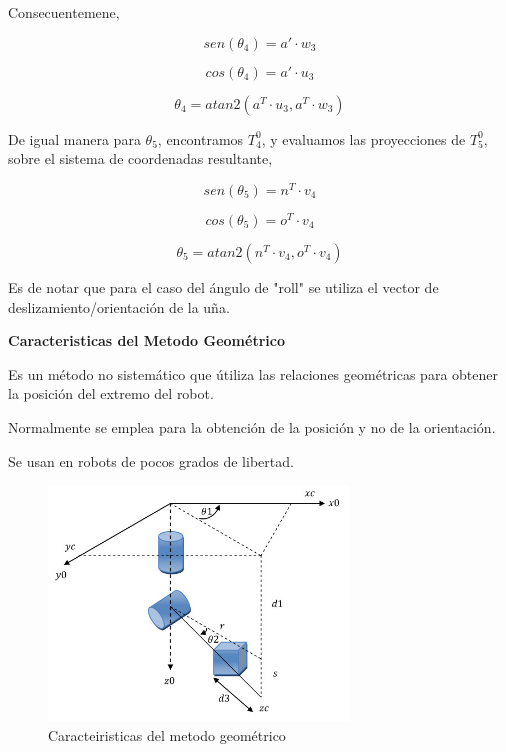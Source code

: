 \documentclass[letter,openright,12pt,spanish]{report}
\begin{document}
Consecuentemene,

\begin{displaymath}
sen(\theta_4)=a'\cdot w_3
\end{displaymath}

\begin{displaymath}
cos(\theta_4)=a'\cdot u_3
\end{displaymath}

\begin{displaymath}
\theta_4=atan2(a^T\cdot u_3,a^T\cdot w_3)
\end{displaymath}

De igual manera para $\theta_5$, encontramos $T^0_4$, y evaluamos las proyecciones de $T^0_5$, sobre el sistema de coordenadas resultante,

\begin{displaymath}
sen(\theta_5)=n^T\cdot v_4
\end{displaymath}

\begin{displaymath}
cos(\theta_5)=o^T \cdot v_4
\end{displaymath}

\begin{displaymath}
\theta_5=atan2(n^T\cdot v_4, o^T \cdot v_4)
\end{displaymath}

Es de notar que para el caso del \'angulo de "roll" se utiliza el vector de deslizamiento/orientaci\'on de la u\~na.

\textbf{Caracteristicas del Metodo Geom\'etrico}

Es un m\'etodo no sistem\'atico que \'utiliza las relaciones geom\'etricas para obtener la posici\'on del extremo del robot.

Normalmente se emplea para la obtenci\'on de la posici\'on y no de la orientaci\'on.

Se usan en robots de pocos grados de libertad.

\begin{figure}[htp]
\centering
\includegraphics[width=8cm]{2.jpg}
\caption{Caracteiristicas del metodo geom\'etrico}
\label{Figura 3}
\end{figure}
\end{document}
